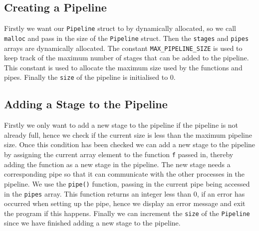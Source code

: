 \documentclass{article}
\begin{document}
    \subsection{Creating a Pipeline}
    Firstly we want our \verb+Pipeline+ struct to by dynamically allocated, so we call \verb+malloc+ and pass in the size of the \verb+Pipeline+ struct.
    Then the \verb+stages+ and \verb+pipes+ arrays are dynamically allocated.
    The constant \verb+MAX_PIPELINE_SIZE+ is used to keep track of the maximum number of stages that can be added to the pipeline.
    This constant is used to allocate the maximum size used by the functions and pipes.
    Finally the \verb+size+ of the pipeline is initialised to 0.
    
    \subsection{Adding a Stage to the Pipeline}
    Firstly we only want to add a new stage to the pipeline if the pipeline is not already full, hence we check if the current size is less than the maximum pipeline size.
    Once this condition has been checked we can add a new stage to the pipeline by assigning the current array element to the function \verb+f+ passed in, thereby adding the function as a new stage in the pipeline.
    The new stage needs a corresponding pipe so that it can communicate with the other processes in the pipeline.
    We use the \verb+pipe()+ function, passing in the current pipe being accessed in the \verb+pipes+ array.
    This function returns an integer less than 0, if an error has occurred when setting up the pipe, hence we display an error message and exit the program if this happens.
    Finally we can increment the \verb+size+ of the \verb+Pipeline+ since we have finished adding a new stage to the pipeline.
    
\end{document}
